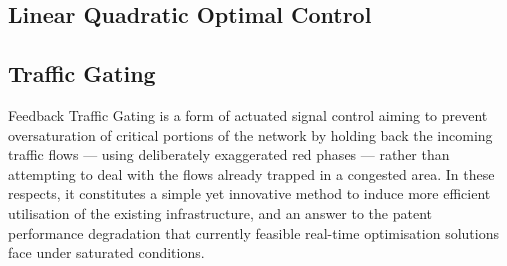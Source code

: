 
\subsection{Linear Quadratic Optimal Control}

\subsection{Traffic Gating}

Feedback Traffic Gating is a form of actuated signal control aiming to prevent oversaturation of critical portions of the network by holding back the incoming traffic flows — using deliberately exaggerated red phases — rather than attempting to deal with the flows already trapped in a congested area. In these respects, it constitutes a simple yet innovative method to induce more efficient utilisation of the existing infrastructure, and an answer to the patent performance degradation that currently feasible real-time optimisation solutions face under saturated conditions.

\subsubsection*{}

\subsubsection*{}


